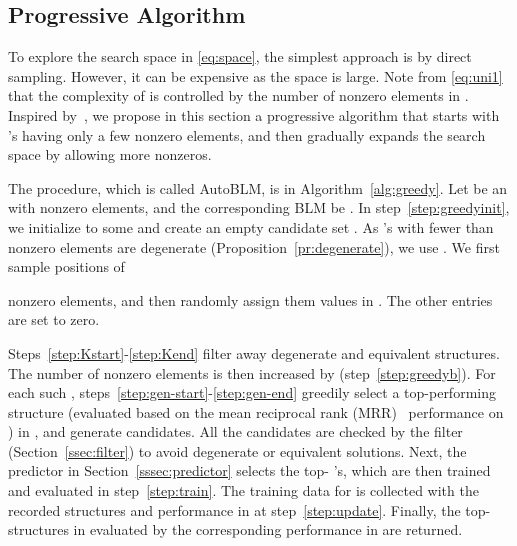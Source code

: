 \documentclass[10pt,journal,compsoc]{IEEEtran}
\begin{document}
\subsection{Progressive Algorithm}
\label{ssec:progressive}

To explore the search space  in \eqref{eq:space},
the simplest approach 
is by direct sampling.
However,
it can be expensive as the
space
is large.
Note from \eqref{eq:uni1} that the 
complexity of  is controlled by
the number of nonzero elements in . 
Inspired by~\cite{liu2018progressive},
we 
propose in this section a progressive algorithm
that starts with
's having only a few
nonzero elements, 
and
then gradually expands the search space
by allowing more nonzeros.

The procedure,
which is called AutoBLM,
is in Algorithm~\ref{alg:greedy}.
Let  be an
 with
 nonzero elements, and the corresponding BLM be .
In step~\ref{step:greedyinit}, we initialize  to some  and create an empty candidate set .
As 's with fewer than  nonzero elements are degenerate
(Proposition~\ref{pr:degenerate}),
we
use . 
We first sample 
positions of  
 
nonzero elements, and
then
randomly assign them
values in .
The other entries
are set 
to zero.

Steps~\ref{step:Kstart}-\ref{step:Kend}
	filter away degenerate and equivalent structures.
The number of nonzero elements  is then increased by 
(step~\ref{step:greedyb}).
For each such ,
steps~\ref{step:gen-start}-\ref{step:gen-end}
greedily  select a top-performing 
structure (evaluated based on the mean reciprocal rank (MRR)~\cite{wang2017knowledge} 
performance on ) in ,
and
generate   candidates.
All the candidates 
are checked by the filter
 (Section~\ref{ssec:filter}) 
to avoid degenerate 
or equivalent solutions.
Next, the
predictor  in Section~\ref{sssec:predictor}
selects
the top- 's,
which are then trained and evaluated in step~\ref{step:train}.
The training data for  is collected with the recorded structures 
and performance
in  at step~\ref{step:update}.
Finally,
the top- structures in  evaluated by the corresponding performance
in  are returned.
\end{document}
